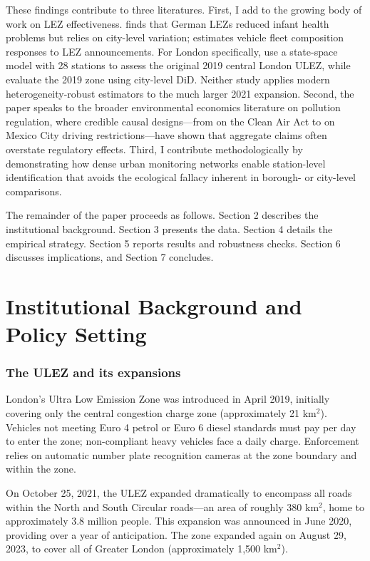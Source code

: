 \documentclass[12pt]{article}
\begin{document}
These findings contribute to three literatures. First, I add to the growing body of work on LEZ effectiveness. \citet{gehrsitz2017} finds that German LEZs reduced infant health problems but relies on city-level variation; \citet{wolff2014} estimates vehicle fleet composition responses to LEZ announcements. For London specifically, \citet{mudway2022} use a state-space model with 28 stations to assess the original 2019 central London ULEZ, while \citet{beshirFichera2025} evaluate the 2019 zone using city-level DiD. Neither study applies modern heterogeneity-robust estimators to the much larger 2021 expansion. Second, the paper speaks to the broader environmental economics literature on pollution regulation, where credible causal designs---from \citet{chay2003} on the Clean Air Act to \citet{davis2008} on Mexico City driving restrictions---have shown that aggregate claims often overstate regulatory effects. Third, I contribute methodologically by demonstrating how dense urban monitoring networks enable station-level identification that avoids the ecological fallacy inherent in borough- or city-level comparisons.

The remainder of the paper proceeds as follows. Section 2 describes the institutional background. Section 3 presents the data. Section 4 details the empirical strategy. Section 5 reports results and robustness checks. Section 6 discusses implications, and Section 7 concludes.


\section{Institutional Background and Policy Setting}

\subsubsection*{The ULEZ and its expansions} London's Ultra Low Emission Zone was introduced in April 2019, initially covering only the central congestion charge zone (approximately 21 km$^2$). Vehicles not meeting Euro 4 petrol or Euro 6 diesel standards must pay  per day to enter the zone; non-compliant heavy vehicles face a  daily charge. Enforcement relies on automatic number plate recognition cameras at the zone boundary and within the zone.

On October 25, 2021, the ULEZ expanded dramatically to encompass all roads within the North and South Circular roads---an area of roughly 380 km$^2$, home to approximately 3.8 million people. This expansion was announced in June 2020, providing over a year of anticipation. The zone expanded again on August 29, 2023, to cover all of Greater London (approximately 1,500 km$^2$).
\end{document}
